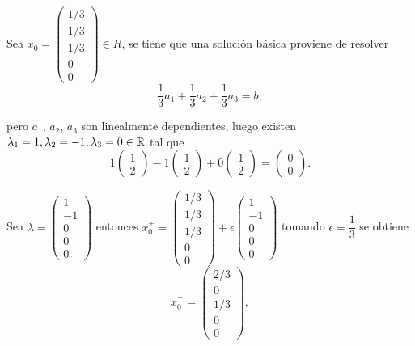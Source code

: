 \begin{solucion}
Sea $x_0=\left(\begin{array}{c}
1/3\\1/3\\1/3\\0\\0
\end{array}\right)\in R$, se tiene que una solución básica proviene de resolver
$$\frac{1}{3}a_1+\frac{1}{3}a_2+\frac{1}{3}a_3=b,$$

pero $a_1$, $a_2$, $a_3$ son linealmente dependientes, luego existen $\lambda_1=1,\lambda_2=-1,\lambda_3=0\in\mathbb R$ tal que
$$1\left(
	\begin{array}{c}
			1 \\
			2
	\end{array}
\right)-1\left(
	\begin{array}{c}
			1 \\
			2
	\end{array}
\right)+0\left(
	\begin{array}{c}
			1 \\
			2
	\end{array}
\right)=\left(
	\begin{array}{c}
			0 \\
			0
	\end{array}
\right).$$

Sea $\lambda=\left(
\begin{array}{r}
1\\-1\\0\\0\\0
\end{array}
\right)$ entonces $x_0^+=\left(\begin{array}{c}
1/3\\1/3\\1/3\\0\\0
\end{array}\right)+\epsilon\left(
\begin{array}{r}
1\\-1\\0\\0\\0
\end{array}
\right)$ tomando $\epsilon=\dfrac{1}{3}$ se obtiene
$$x_0^+=\left(\begin{array}{c}
2/3\\0\\1/3\\0\\0
\end{array}\right),$$


\end{solucion}

